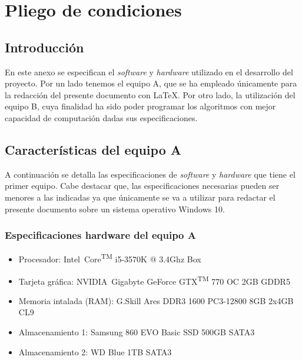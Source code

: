 \chapter{Pliego de condiciones}
\label{cha:pliego-de-condiciones}

\section{Introducción}
\label{sec:intro-pliego}

En este anexo se especifican el \textit{software} y \textit{hardware} utilizado en el desarrollo del proyecto. Por un lado tenemos el equipo A, que se ha empleado únicamente para la redacción del presente documento con \LaTeX. Por otro lado, la utilización del equipo B, cuya finalidad ha sido poder programar los algoritmos con mejor capacidad de computación dadas sus especificaciones.

\section{Características del equipo A}
\label{sec:caracteristicas-equipoa}

A continuación se detalla las especificaciones de \textit{software} y \textit{hardware} que tiene el primer equipo. Cabe destacar que, las especificaciones necesarias pueden ser menores a las indicadas ya que únicamente se va a utilizar para redactar el presente documento sobre un sistema operativo Windows 10.

\subsection{Especificaciones hardware del equipo A}
\label{subsec:especificaciones-hardware-equipoa}
\begin{itemize}
    \item Procesador: Intel\textregistered\ Core\textsuperscript{TM} i5-3570K @ 3.4Ghz Box
    \item Tarjeta gráfica: NVIDIA\textregistered\ Gigabyte GeForce GTX\textsuperscript{TM} 770 OC 2GB GDDR5
    \item Memoria intalada (RAM): G.Skill Ares DDR3 1600 PC3-12800 8GB 2x4GB CL9
    \item Almacenamiento 1: Samsung 860 EVO Basic SSD 500GB SATA3
    \item Almacenamiento 2: WD Blue 1TB SATA3
\end{itemize}


